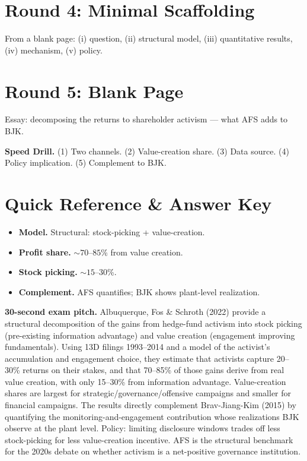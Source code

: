 \documentclass[11pt]{article}
\begin{document}
\section*{Round 4: Minimal Scaffolding}
From a blank page: (i) question, (ii) structural model, (iii) quantitative results, (iv) mechanism, (v) policy.

\section*{Round 5: Blank Page}
Essay: decomposing the returns to shareholder activism --- what AFS adds to BJK.

\vspace{6pt}
\begin{drillbox}
\textbf{Speed Drill.} (1) Two channels. (2) Value-creation share. (3) Data source. (4) Policy implication. (5) Complement to BJK.
\end{drillbox}

\section*{Quick Reference \& Answer Key}
\begin{answerbox}
\begin{itemize}
\item \textbf{Model.} Structural: stock-picking + value-creation.
\item \textbf{Profit share.} $\sim 70$--$85$\% from value creation.
\item \textbf{Stock picking.} $\sim 15$--$30$\%.
\item \textbf{Complement.} AFS quantifies; BJK shows plant-level realization.
\end{itemize}
\end{answerbox}

\begin{keybox}
\textbf{30-second exam pitch.} Albuquerque, Fos \& Schroth (2022) provide a structural decomposition of the gains from hedge-fund activism into stock picking (pre-existing information advantage) and value creation (engagement improving fundamentals). Using 13D filings 1993--2014 and a model of the activist's accumulation and engagement choice, they estimate that activists capture 20--30\% returns on their stakes, and that 70--85\% of those gains derive from real value creation, with only 15--30\% from information advantage. Value-creation shares are largest for strategic/governance/offensive campaigns and smaller for financial campaigns. The results directly complement Brav-Jiang-Kim (2015) by quantifying the monitoring-and-engagement contribution whose realizations BJK observe at the plant level. Policy: limiting disclosure windows trades off less stock-picking for less value-creation incentive. AFS is the structural benchmark for the 2020s debate on whether activism is a net-positive governance institution.
\end{keybox}
\end{document}
